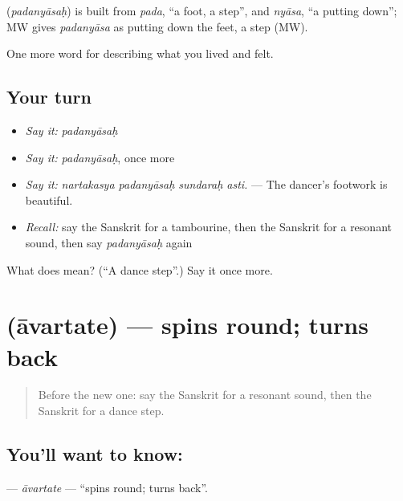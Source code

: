 \begin{cousinweb}
\textbf{} (\emph{padanyāsaḥ}) is built from \emph{pada}, \textquotedblleft{}a foot, a step\textquotedblright{}, and \emph{nyāsa}, \textquotedblleft{}a putting down\textquotedblright{}; MW gives \emph{padanyāsa} as putting down the feet, a step (MW).
\end{cousinweb}

\begin{grammarlens}[title={What you've built}]
One more word for describing what you lived and felt.
\end{grammarlens}

\subsection*{Your turn}
\begin{itemize}
\raggedright
  \item \emph{Say it:} \emph{padanyāsaḥ}
  \item \emph{Say it:} \emph{padanyāsaḥ}, once more
  \item \emph{Say it:} \emph{nartakasya padanyāsaḥ sundaraḥ asti.} — The dancer's footwork is beautiful.
  \item \emph{Recall:} say the Sanskrit for a tambourine, then the Sanskrit for a resonant sound, then say \emph{padanyāsaḥ} again
\end{itemize}

\begin{tcolorbox}[breakable,colback=teal!4,colframe=teal!35!black,title={Before you move on}]
What does  mean? (\textquotedblleft{}A dance step\textquotedblright{}.) Say it once more.
\end{tcolorbox}
\section[\texorpdfstring{\sk{आवर्तते} (āvartate)}{आवर्तते (āvartate)}]{ (āvartate) — spins round; turns back}

\label{lesson:SA-C522-avartate}



\begin{quote}
Before the new one: say the Sanskrit for a resonant sound, then the Sanskrit for a dance step.
\end{quote}

\subsection*{You'll want to know: }
\textbf{} — \emph{āvartate} — \textquotedblleft{}spins round; turns back\textquotedblright{}.

